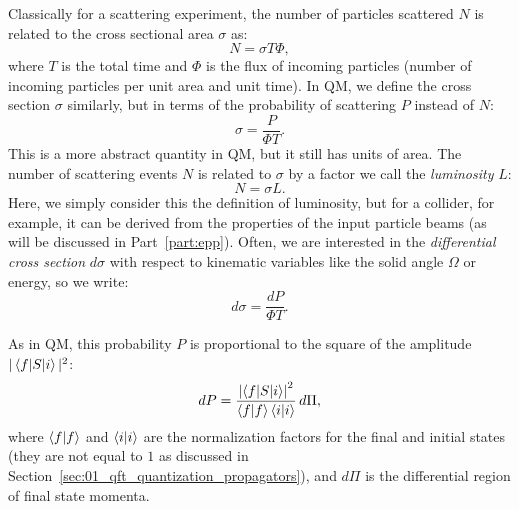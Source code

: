 Classically for a scattering experiment, the number of particles scattered $N$ is related to the cross sectional area $\sigma$ as:
\begin{equation}
	\label{eq:01_qft_interactions_cross_section_classical}
	N = \sigma T \Phi,
\end{equation}
where $T$ is the total time and $\Phi$ is the flux of incoming particles (number of incoming particles per unit area and unit time).
In QM, we define the cross section $\sigma$ similarly, but in terms of the probability of scattering $P$ instead of $N$:
\begin{equation}
	\label{eq:01_qft_interactions_cross_section_qm}
	\sigma = \frac{P}{\Phi T}.
\end{equation}
This is a more abstract quantity in QM, but it still has units of area.
The number of scattering events $N$ is related to $\sigma$ by a factor we call the \textit{luminosity} $L$:
\begin{equation}
	\label{eq:01_qft_interactions_cross_section_luminosity}
	N = \sigma L.
\end{equation}
Here, we simply consider this the definition of luminosity, but for a collider, for example, it can be derived from the properties of the input particle beams  (as will be discussed in Part~\ref{part:epp}).
Often, we are interested in the \textit{differential cross section} $d\sigma$ with respect to kinematic variables like the solid angle $\Omega$ or energy, so we write:
\begin{equation}
	\label{eq:01_qft_interactions_cross_section_differential}
	d\sigma = \frac{dP}{\Phi T}.
\end{equation}

As in QM, this probability $P$ is proportional to the square of the amplitude $|\braket{f|S|i}|^2$:
\begin{equation}
	\label{eq:01_qft_interactions_cross_section_probability}
	dP = \frac{\left\lvert \braket{f|S|i} \right\rvert^2}{\braket{f|f}\braket{i|i}}\, d\Pi,
\end{equation}
where $\braket{f|f}$ and $\braket{i|i}$ are the normalization factors for the final and initial states (they are not equal to $1$ as discussed in Section~\ref{sec:01_qft_quantization_propagators}), and $d\Pi$ is the differential region of final state momenta.


